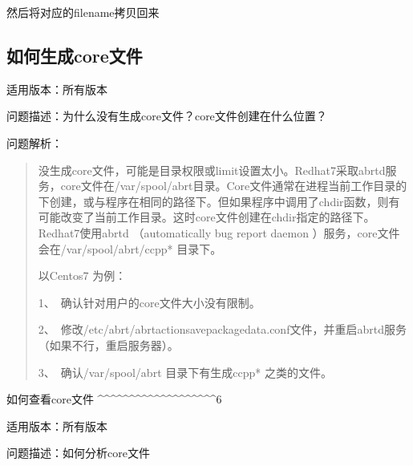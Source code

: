 \documentclass[a4,10pt,oneside,english]{sphinxmanual}
\let\sphinxpxdimen\pdfpxdimen\else\newdimen\sphinxpxdimen
\begin{document}
然后将对应的filename拷贝回来


\subsection{如何生成core文件}
\label{\detokenize{sql:id4}}
适用版本：所有版本

问题描述：为什么没有生成core文件？core文件创建在什么位置？

问题解析：
\begin{quote}

没生成core文件，可能是目录权限或limit设置太小。Redhat7采取abrtd服务，core文件在/var/spool/abrt目录。Core文件通常在进程当前工作目录的下创建，或与程序在相同的路径下。但如果程序中调用了chdir函数，则有可能改变了当前工作目录。这时core文件创建在chdir指定的路径下。Redhat7使用abrtd （automatically bug report daemon ）服务，core文件会在/var/spool/abrt/ccpp* 目录下。

以Centos7 为例：

1、 确认针对用户的core文件大小没有限制。

\begin{figure}[H]
\centering

\noindent\sphinxincludegraphics[width=243\sphinxpxdimen,height=34\sphinxpxdimen]{{FAQ2141}.png}
\end{figure}

2、 修改/etc/abrt/abrt\sphinxhyphen{}action\sphinxhyphen{}save\sphinxhyphen{}package\sphinxhyphen{}data.conf文件，并重启abrtd服务（如果不行，重启服务器）。

\begin{sphinxVerbatim}[commandchars=\\\{\}]
  
  
\end{sphinxVerbatim}

3、 确认/var/spool/abrt 目录下有生成ccpp* 之类的文件。
\end{quote}

如何查看core文件
\textasciicircum{}\textasciicircum{}\textasciicircum{}\textasciicircum{}\textasciicircum{}\textasciicircum{}\textasciicircum{}\textasciicircum{}\textasciicircum{}\textasciicircum{}\textasciicircum{}\textasciicircum{}\textasciicircum{}\textasciicircum{}\textasciicircum{}\textasciicircum{}\textasciicircum{}\textasciicircum{}\textasciicircum{}6

适用版本：所有版本

问题描述：如何分析core文件
\end{document}
